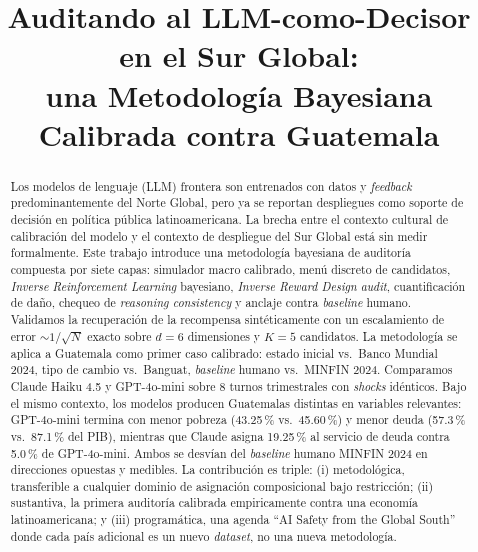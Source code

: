 \documentclass[conference]{IEEEtran}
\begin{document}
\title{Auditando al LLM-como-Decisor en el Sur Global:\\
una Metodolog\'ia Bayesiana Calibrada contra Guatemala}

\author{
\IEEEauthorblockN{[Autor]}
}

\maketitle

\begin{abstract}
Los modelos de lenguaje (LLM) frontera son entrenados con datos y
\emph{feedback} predominantemente del Norte Global, pero ya se reportan
despliegues como soporte de decisi\'on en pol\'itica p\'ublica
latinoamericana. La brecha entre el contexto cultural de calibraci\'on
del modelo y el contexto de despliegue del Sur Global est\'a sin medir
formalmente. Este trabajo introduce una metodolog\'ia bayesiana de
auditor\'ia compuesta por siete capas: simulador macro calibrado,
men\'u discreto de candidatos, \emph{Inverse Reinforcement Learning}
bayesiano, \emph{Inverse Reward Design} \emph{audit}, cuantificaci\'on
de da\~no, chequeo de \emph{reasoning consistency} y anclaje contra
\emph{baseline} humano. Validamos la recuperaci\'on de la recompensa
sint\'eticamente con un escalamiento de error
$\sim 1/\sqrt{N}$ exacto sobre $d{=}6$ dimensiones y $K{=}5$
candidatos. La metodolog\'ia se aplica a Guatemala como primer caso
calibrado: estado inicial vs.\ Banco Mundial 2024, tipo de cambio vs.\
Banguat, \emph{baseline} humano vs.\ MINFIN 2024. Comparamos Claude
Haiku 4.5 y GPT-4o-mini sobre 8 turnos trimestrales con \emph{shocks}
id\'enticos. Bajo el mismo contexto, los modelos producen Guatemalas
distintas en variables relevantes: GPT-4o-mini termina con menor
pobreza (43.25\,\% vs.\ 45.60\,\%) y menor deuda (57.3\,\% vs.\
87.1\,\% del PIB), mientras que Claude asigna 19.25\,\% al servicio de
deuda contra 5.0\,\% de GPT-4o-mini. Ambos se desv\'ian del
\emph{baseline} humano MINFIN 2024 en direcciones opuestas y medibles.
La contribuci\'on es triple: (i) metodol\'ogica, transferible a
cualquier dominio de asignaci\'on composicional bajo restricci\'on;
(ii) sustantiva, la primera auditor\'ia calibrada empiricamente contra
una econom\'ia latinoamericana; y (iii) program\'atica, una agenda
``AI Safety from the Global South'' donde cada pa\'is adicional es un
nuevo \emph{dataset}, no una nueva metodolog\'ia.
\end{abstract}
\end{document}
